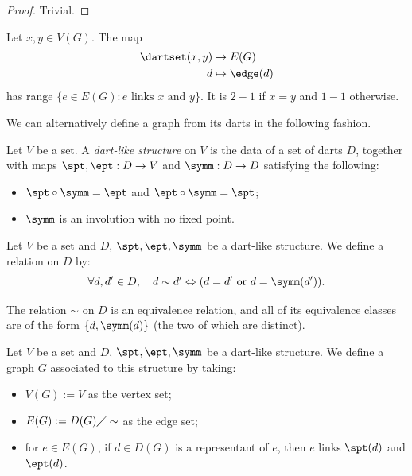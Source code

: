 \begin{proof}
  \leanok
  Trivial.
\end{proof}

\begin{lemma}
  \label{lem:edge_range_of_darset}
  Let $x, y \in V(G)$.
  The map
  \begin{equation*}
    \begin{split}
      \dartset(x,y) & \rightarrow E(G) \\
      d & \mapsto \edge(d)
    \end{split}
  \end{equation*}
  has range $\{e \in E(G) : e \text{ links } x \text{ and } y\}$.
  It is $2-1$ if $x=y$ and $1-1$ otherwise.
\end{lemma}

We can alternatively define a graph from its darts in the following fashion.

\begin{definition}
  \label{def:dartlike}
  Let $V$ be a set. A \emph{dart-like structure} on $V$ is the data of a set of darts $D$,
  together with maps $\spt, \ept : D \rightarrow V$ and
  $\symm : D \rightarrow D$ satisfying the following:
  \begin{itemize}
    \item $\spt \circ \symm = \ept$ and $\ept \circ \symm = \spt$;
    \item $\symm$ is an involution with no fixed point.
  \end{itemize}
\end{definition}

\begin{definition}
  \label{def:dart_eq_rel}
  Let $V$ be a set and $D$, $\spt, \ept, \symm$ be a dart-like structure.
  We define a relation on $D$ by:
  \begin{equation*}
    \forall d, d' \in D,
    \quad d \sim d' \Leftrightarrow (d=d' \text{ or } d = \symm(d')).
  \end{equation*}
\end{definition}

\begin{lemma}
  \label{lem:dart_eq_rel}
  The relation $\sim$ on $D$ is an equivalence relation, and all of its equivalence
  classes are of the form $\{d, \symm(d)\}$ (the two of which are distinct).
\end{lemma}

\begin{definition}
  \label{def:graph_of_dart}
  Let $V$ be a set and $D$, $\spt, \ept, \symm$ be a dart-like structure.
  We define a graph $G$ associated to this structure by taking:
  \begin{itemize}
    \item $V(G) := V$ as the vertex set;
    \item $E(G) := D(G) \diagup \sim$ as the edge set;
    \item for $e \in E(G)$, if $d \in D(G)$ is a representant of $e$,
    then $e$ links $\spt(d)$ and $\ept(d)$.
  \end{itemize}
\end{definition}

